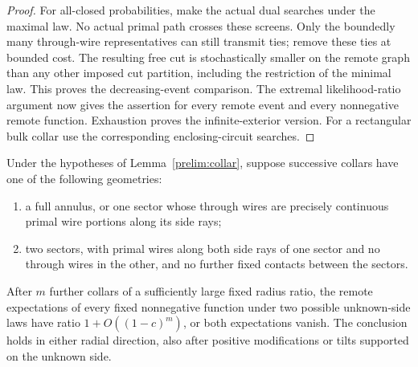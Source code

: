 \begin{proof}
For all-closed probabilities, make the actual dual searches under the
maximal law. No actual primal path crosses these screens. Only the
boundedly many through-wire representatives can still transmit ties;
remove these ties at bounded cost. The resulting free cut is
stochastically smaller on the remote graph than any other imposed cut
partition, including the restriction of the minimal law. This proves
the decreasing-event comparison. The extremal likelihood-ratio argument
now gives the assertion for every remote event and every nonnegative
remote function. Exhaustion proves the infinite-exterior version.
For a rectangular bulk collar use the corresponding enclosing-circuit
searches.
\end{proof}

\begin{lemma}\label{prelim:relative-collar}
Under the hypotheses of Lemma~\ref{prelim:collar}, suppose successive
collars have one of the following geometries:
\begin{enumerate}[label=(\roman*)]
\item a full annulus, or one sector whose through wires are precisely
continuous primal wire portions along its side rays;
\item two sectors, with primal wires along both side rays of one sector
and no through wires in the other, and no further fixed contacts
between the sectors.
\end{enumerate}
After $m$ further collars of a sufficiently large fixed radius ratio,
the remote expectations of every fixed nonnegative function under two
possible unknown-side laws have ratio
$1+O((1-c)^m)$, or both expectations vanish. The conclusion holds in
either radial direction, also after positive modifications or tilts
supported on the unknown side.
\end{lemma}

